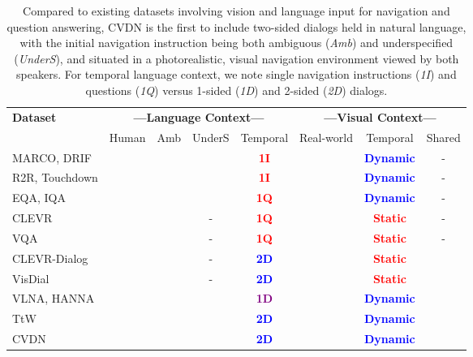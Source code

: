 \documentclass{article}
\newcommand{\dataset}{CVDN}
\newcommand{\cmark}{\color{blue}{\ding{51}}}
\newcommand{\xmark}{\color{red}{\ding{55}}}
\newcommand{\good}[1]{\textcolor{blue}{\textbf{#1}}}
\newcommand{\bad}[1]{\textcolor{red}{\textbf{#1}}}
\newcommand{\neutral}[1]{\textcolor{purple}{\textbf{#1}}}
\begin{document}
\begin{table}[ht!]
\centering
\begin{small}
\begin{tabular}{lccccccc}
    \textbf{Dataset} & \multicolumn{4}{c}{\textbf{---Language Context---}} & \multicolumn{3}{c}{\textbf{---Visual Context---}} \\
    & Human & Amb & UnderS & Temporal & Real-world & Temporal & Shared \\
    \toprule
MARCO\cite{macmahon:aaai06,chen:aaai11}, DRIF\cite{blukis:corl18} & \cmark & \xmark & \xmark & \bad{1I} & \xmark & \good{Dynamic} & - \\
    R2R\cite{anderson:cvpr18}, Touchdown\cite{chen:cvpr19} & \cmark & \xmark & \xmark & \bad{1I} & \cmark & \good{Dynamic} & - \\
    EQA\cite{das:cvpr18}, IQA\cite{gordon2018iqa} & \xmark & \xmark & \cmark & \bad{1Q} & \xmark & \good{Dynamic} & - \\
    CLEVR\cite{johnson:cvpr17} & \xmark & \xmark & - & \bad{1Q} & \xmark & \bad{Static} & - \\
    VQA\cite{antol:iccv15,hudson:cvpr18,zellers:cvpr19} & \cmark & \xmark & - & \bad{1Q} & \cmark & \bad{Static} & - \\
    CLEVR-Dialog\cite{kottur:naacl19} & \xmark & \xmark & - & \good{2D} & \xmark & \bad{Static} & \cmark \\
    VisDial\cite{das:cvpr17} & \cmark & \xmark & - & \good{2D} & \cmark & \bad{Static} & \cmark \\
    VLNA\cite{nguyen:cvpr19}, HANNA\cite{nguyen:emnlp19} & \xmark & \cmark & \cmark & \neutral{1D} & \cmark & \good{Dynamic} & \xmark \\
    TtW\cite{devries:arxiv18} & \cmark & \xmark & \cmark & \good{2D} & \cmark & \good{Dynamic} & \xmark \\
    \midrule
    \dataset{} & \cmark & \cmark & \cmark & \good{2D} & \cmark & \good{Dynamic} & \cmark \\
    \bottomrule
\end{tabular}
\end{small}
\caption{
Compared to existing datasets involving vision and language input for navigation and question answering, \dataset{} is the first to include two-sided dialogs held in natural language, with the initial navigation instruction being both ambiguous (\textit{Amb}) and underspecified (\textit{UnderS}), and situated in a photorealistic, visual navigation environment viewed by both speakers.
For temporal language context, we note single navigation instructions (\textit{1I}) and questions (\textit{1Q}) versus 1-sided (\textit{1D}) and 2-sided (\textit{2D}) dialogs.
}
\vspace{-6mm}
\label{tab:rw_comparison}
\end{table}
\end{document}
